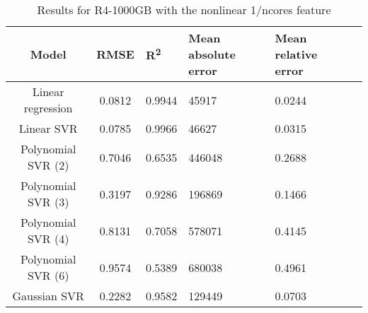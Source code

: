 \begin{table}[H]
\centering
\begin{adjustbox}{center}
\begin{tabular}{c | c M{1.2cm} M{2.5cm} M{2.5cm} M{1.8cm}}
Model & RMSE & R\textsuperscript{2} & Mean absolute error & Mean relative error \tabularnewline
\hline
Linear regression & 0.0812 & 0.9944 &  45917 & 0.0244 \\
Linear SVR & 0.0785 & 0.9966 &  46627 & 0.0315 \\
Polynomial SVR (2) & 0.7046 & 0.6535 & 446048 & 0.2688 \\
Polynomial SVR (3) & 0.3197 & 0.9286 & 196869 & 0.1466 \\
Polynomial SVR (4) & 0.8131 & 0.7058 & 578071 & 0.4145 \\
Polynomial SVR (6) & 0.9574 & 0.5389 & 680038 & 0.4961 \\
Gaussian SVR & 0.2282 & 0.9582 & 129449 & 0.0703 \\
\end{tabular}
\end{adjustbox}
\\
\caption{Results for R4-1000GB with the nonlinear 1/ncores feature}
\label{tab:all_nonlinear_R4_1000}
\end{table}

